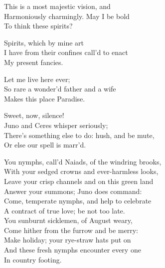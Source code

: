 \begin{verse_speech}[Ferdinand] 
This is a most majestic vision, and\\
Harmoniously charmingly. May I be bold\\
To think these spirits?
\end{verse_speech}


\begin{verse_speech}[Prospero] 
Spirits, which by mine art\\
I have from their confines call'd to enact\\
My present fancies.
\end{verse_speech}

\begin{verse_speech}[Ferdinand] 
Let me live here ever;\\
So rare a wonder'd father and a wife\\
Makes this place Paradise.
\end{verse_speech}


\begin{verse_speech}[Prospero] 
Sweet, now, silence!\\
Juno and Ceres whisper seriously;\\
There's something else to do: hush, and be mute,\\
Or else our spell is marr'd.
\end{verse_speech}

\begin{verse_speech}[Iris] 
You nymphs, call'd Naiads, of the windring brooks,\\
With your sedged crowns and ever-harmless looks,\\
Leave your crisp channels and on this green land\\
Answer your summons; Juno does command:\\
Come, temperate nymphs, and help to celebrate\\
A contract of true love; be not too late.\\
You sunburnt sicklemen, of August weary,\\
Come hither from the furrow and be merry:\\
Make holiday; your rye-straw hats put on\\
And these fresh nymphs encounter every one\\
In country footing.
\end{verse_speech}

